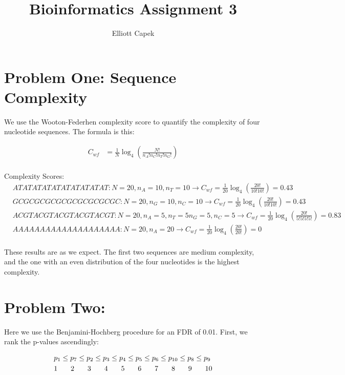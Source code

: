 \documentclass[10pt]{article} %
\title{Bioinformatics Assignment 3}
\author{Elliott Capek}
\begin{document}
\maketitle{}

\section{Problem One: Sequence Complexity}
We use the Wooton-Federhen complexity score to quantify the complexity of four nucleotide sequences.
The formula is this:

\begin{align*}
  C_{wf} &= \frac{1}{N}\log_4\left(\frac{N!}{n_A!n_C!n_T!n_G!}\right)\\
\end{align*}

Complexity Scores:
\begin{align*}
  &ATATATATATATATATATAT: N=20, n_A=10, n_T=10 \rightarrow C_{wf}
  = \frac{1}{20}\log_4\left(\frac{20!}{10!10!}\right) = 0.43\\
  &GCGCGCGCGCGCGCGCGCGC: N=20, n_G=10, n_C=10 \rightarrow C_{wf}
  = \frac{1}{20}\log_4\left(\frac{20!}{10!10!}\right) = 0.43\\
  &ACGTACGTACGTACGTACGT: N=20, n_A=5, n_T=5 n_G=5, n_C=5 \rightarrow C_{wf}
  = \frac{1}{20}\log_4\left(\frac{20!}{5!5!5!5!}\right) = 0.83\\
  &AAAAAAAAAAAAAAAAAAAA: N=20, n_A=20 \rightarrow C_{wf}
  = \frac{1}{20}\log_4\left(\frac{20!}{20!}\right) = 0\\
\end{align*}

These results are as we expect. The first two sequences are medium complexity, and the one with
an even distribution of the four nucleotides is the highest complexity.\\

\section{Problem Two: }
Here we use the Benjamini-Hochberg procedure for an FDR of 0.01. First, we rank the p-values
ascendingly:

\begin{align*}
  &p_1 \leq p_7 \leq p_2 \leq p_3 \leq p_4 \leq p_5 \leq p_6 \leq p_{10} \leq p_8 \leq p_9\\
  &1\hspace{0.65cm}2\hspace{0.65cm}3\hspace{0.65cm}4\hspace{0.65cm}5\hspace{0.65cm}6\hspace{0.65cm}
  7\hspace{0.65cm}8\hspace{0.65cm}9\hspace{0.65cm}10\\
\end{align*}
\end{document}
